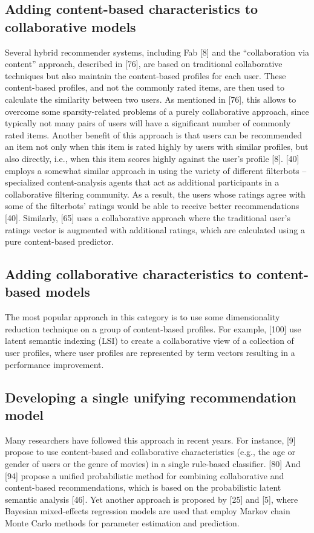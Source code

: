 \subsection{Adding content-based characteristics to collaborative models}
Several hybrid recommender systems, including Fab [8] and the “collaboration via content” approach, described in [76], are based on traditional collaborative techniques but also maintain the content-based profiles for each user. These content-based profiles, and not the commonly rated items, are then used to calculate the similarity between two users. As mentioned in [76], this allows to overcome some sparsity-related problems of a purely collaborative approach, since typically not many pairs of users will have a significant number of commonly rated items. Another benefit of this approach is that users can be recommended an item not only when this item is rated highly by users with similar profiles, but also directly, i.e., when this item scores highly against the user’s profile [8]. [40] employs a somewhat similar approach in using the variety of different filterbots – specialized content-analysis agents that act as additional participants in a collaborative filtering community. As a result, the users whose ratings agree with some of the filterbots’ ratings would be able to receive better recommendations [40]. Similarly, [65] uses a collaborative approach where the traditional user’s ratings vector is augmented with additional ratings, which are calculated using a pure content-based predictor.

\subsection{Adding collaborative characteristics to content-based models}
The most popular approach in this category is to use some dimensionality reduction technique on a group of content-based profiles. For example, [100] use latent semantic indexing (LSI) to create a collaborative view of a collection of user profiles, where user profiles are represented by term vectors  resulting in a performance improvement.

\subsection{Developing a single unifying recommendation model}
Many researchers have followed this approach in recent years. For instance, [9] propose to use content-based and collaborative characteristics (e.g., the age or gender of users or the genre of movies) in a single rule-based classifier. [80] And [94] propose a unified probabilistic method for combining collaborative and content-based recommendations, which is based on the probabilistic latent semantic analysis [46]. Yet another approach is proposed by [25] and [5], where Bayesian mixed-effects regression models are used that employ Markov chain Monte Carlo methods for parameter estimation and prediction.

